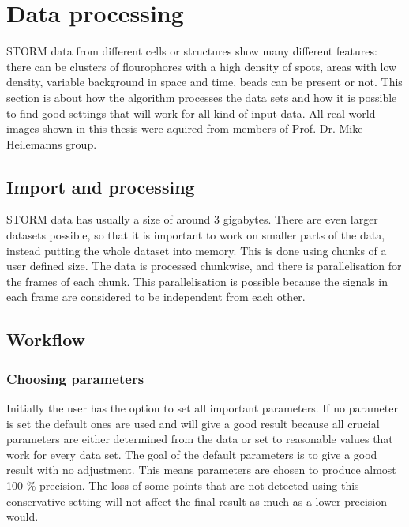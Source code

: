 \chapter{Data processing}
STORM data from different cells or structures show many different features: there can be clusters of flourophores with a high density of spots, areas with low density, variable background in space and time, beads can be present or not. This section is about how the algorithm processes the data sets and how it is possible to find good settings that will work for all kind of input data.\newline
All real world images shown in this thesis were aquired from members of Prof. Dr. Mike Heilemanns group.


\section{Import and processing}
STORM data has usually a size of around 3 gigabytes. There are even larger datasets possible, so that it is important to work on smaller parts of the data, instead putting the whole dataset into memory. This is done using chunks of a user defined size. The data is processed chunkwise, and there is parallelisation for the frames of each chunk. This parallelisation is possible because the signals in each frame are considered to be independent from each other.  

\section{Workflow}
\subsection{Choosing parameters}
Initially the user has the option to set all important parameters. If no parameter is set the default ones are used and will give a good result because all crucial parameters are either determined from the data or set to reasonable values that work for every data set. The goal of the default parameters is to give a good result with no adjustment. This means parameters are chosen to produce almost 100 \% precision. The loss of some points that are not detected using this conservative setting will not affect the final result as much as a lower precision would.
